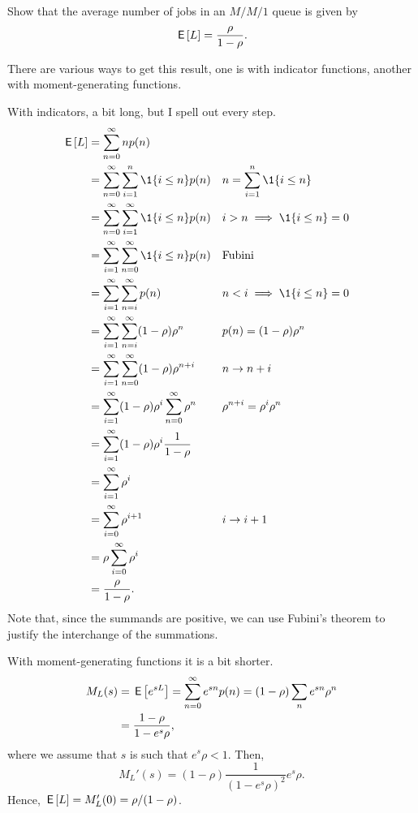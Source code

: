 \begin{exercise}\label{ex:12}
Show that the average number of jobs in an  $M/M/1$ queue is given by
\begin{equation}\label{eq:el}
  \,\mathsf{E}\left[L\right] = \frac \rho{1-\rho}.
\end{equation}
\begin{hint}
There are various ways to get this result, one is with indicator functions, another with moment-generating functions.   
\end{hint}
  \begin{solution}
With indicators, a bit long, but I spell out every step.
\begin{align*}
\E L &= \sum_{n=0}^\infty n p(n) \\
&= \sum_{n=0}^\infty \sum_{i=1}^n \1{i\leq n} p(n)  && n=\sum_{i=1}^n \1{i\leq n}\\
&= \sum_{n=0}^\infty \sum_{i=1}^\infty   \1{i\leq n} p(n)  && i>n\implies \1{i\leq n} = 0\\
&= \sum_{i=1}^\infty \sum_{n=0}^\infty  \1{i\leq n} p(n) &&\text{Fubini} \\
&= \sum_{i=1}^\infty \sum_{n=i}^\infty p(n) && n < i \implies \1{i\leq n}=0 \\
&= \sum_{i=1}^\infty \sum_{n=i}^\infty (1-\rho)\rho^n && p(n) = (1-\rho)\rho^n \\
&= \sum_{i=1}^\infty \sum_{n=0}^\infty (1-\rho)\rho^{n+i} && n\to n+i \\
&= \sum_{i=1}^\infty (1-\rho)\rho^i \sum_{n=0}^\infty \rho^n && \rho^{n+i}=\rho^i \rho^n\\
&= \sum_{i=1}^\infty (1-\rho)\rho^i \frac1{1-\rho}   \\
&= \sum_{i=1}^\infty \rho^i \\
&= \sum_{i=0}^\infty \rho^{i+1} && i\to i+1\\
&= \rho \sum_{i=0}^\infty \rho^i \\
&= \frac{\rho}{1-\rho}.
\end{align*}
Note that, since the summands are positive, we can use Fubini's theorem
to justify the interchange of the summations.

With moment-generating functions it is a bit shorter. 
\begin{equation*}
  \begin{split}
  M_L(s) 
&= \,\mathsf{E}\left[e^{s L}\right] = \sum_{n=0}^\infty e^{s n}p(n) = (1-\rho) \sum_n e^{s n} \rho^n \\
&=\frac{1-\rho}{1-e^{s}\rho},
  \end{split}
\end{equation*}
where we assume that $s$ is such that $e^s \rho < 1$. Then, 
\begin{equation*}
  M_L'(s) = (1-\rho) \frac{1}{(1-e^s\rho)^2} e^s \rho.
\end{equation*}
Hence, $\,\mathsf{E}\left[L\right] = M_L'(0) = \rho/(1-\rho)$.
  \end{solution}
\end{exercise}

